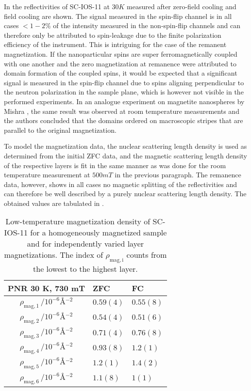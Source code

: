 \documentclass[\main/dresen_thesis.tex]{subfiles}
\begin{document}
  In  the reflectivities of SC-IOS-11 at $30 \unit{K}$ measured after zero-field cooling and field cooling are shown.
  The signal measured in the spin-flip channel is in all cases $<1-2 \%$ of the intensity measured in the non-spin-flip channels and can therefore only be attributed to spin-leakage due to the finite polarization efficiency of the instrument.
  This is intriguing for the case of the remanent magnetization.
  If the nanoparticular spins are super ferromagnetically coupled with one another and the zero magnetization at remanence were attributed to domain formation of the coupled spins, it would be expected that a significant signal is measured in the spin-flip channel due to spins aligning perpendicular to the neutron polarization in the sample plane, which is however not visible in the performed experiments.
  In an analogue experiment on magnetite nanospheres by Mishra \etal \cite{Mishra_2015_Polar}, the same result was observed at room temperature measurements and the authors concluded that the domains ordered on macroscopic stripes that are parallel to the original magnetization.

  To model the magnetization data, the nuclear scattering length density is used as determined from the initial ZFC data, and the magnetic scattering length density of the respective layers is fit in the same manner as was done for the room temperature measurement at $500 \unit{mT}$ in the previous paragraph.
  The remanence data, however, shows in all cases no magnetic splitting of the reflectivities and can therefore be well described by a purely nuclear scattering length density.
  The obtained values are tabulated in .

  \begin{table}[!htbp]
    \centering
    \caption{\label{tab:looselyPackedNP:layers:pnrSCIOS30K730mT}Low-temperature magnetization density of SC-IOS-11 for a homogeneously magnetized sample and for independently varied layer magnetizations. The index of $\rho_\mathrm{mag, i}$ counts from the lowest to the highest layer.}
    \begin{tabular}{ c | l | l}
      \rule{0pt}{2ex} \textbf{PNR \@ 30 K, 730 mT}  & ZFC & FC \\
      \hline
      $\rho_\mathrm{mag, 1} \, / \unit{10^{-6} \angstrom^{-2}} $ & $0.59(4)$ & $0.55(8)$\\
      $\rho_\mathrm{mag, 2} \, / \unit{10^{-6} \angstrom^{-2}} $ & $0.54(4)$ & $0.51(6)$\\
      $\rho_\mathrm{mag, 3} \, / \unit{10^{-6} \angstrom^{-2}} $ & $0.71(4)$ & $0.76(8)$\\
      $\rho_\mathrm{mag, 4} \, / \unit{10^{-6} \angstrom^{-2}} $ & $0.93(8)$ & $1.2(1)$\\
      $\rho_\mathrm{mag, 5} \, / \unit{10^{-6} \angstrom^{-2}} $ & $1.2(1)$  & $1.4(2)$\\
      $\rho_\mathrm{mag, 6} \, / \unit{10^{-6} \angstrom^{-2}} $ & $1.1(8)$  & $1(1)$\\
      \hline
    \end{tabular}
  \end{table}
\end{document}
